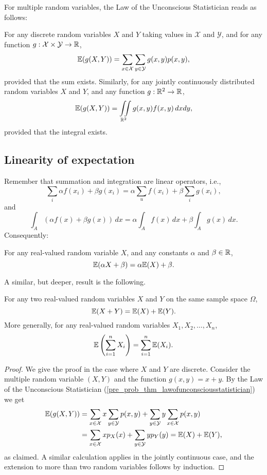 \documentclass[10pt, a4paper]{article}
\begin{document}
For multiple random variables,
the Law of the Unconscious Statistician reads as follows:
\begin{theorem}\label{pre_prob_thm_multilawofunconsciousstatistician}
    For any discrete random variables $X$ and $Y$ taking values in $\mathcal{X}$ and $\mathcal{Y}$,
    and for any function $g : \mathcal{X} \times \mathcal{Y} \rightarrow \mathbb{R}$,
    \[
    \mathbb{E}(g(X, Y)) = \sum_{x \in \mathcal{X}}\sum_{y \in \mathcal{Y}}g(x, y)p(x, y),
    \]
    provided that the sum exists.
    Similarly,
    for any jointly continuously distributed random variables $X$ and $Y$,
    and any function $g : \mathbb{R} ^ 2 \rightarrow \mathbb{R}$,
    \[
    \mathbb{E}(g(X, Y)) = \iint\limits_{\mathbb{R} ^ 2}g(x, y)f(x, y)\,dxdy,
    \]
    provided that the integral exists.
\end{theorem}

\subsection{Linearity of expectation}
Remember that summation and integration are linear operators,
i.e.,
\[
\sum_{i}\alpha f(x_i) + \beta g(x_i) = \alpha\sum_{u}f(x_i) + \beta\sum_{i}g(x_i),
\]
and
\[
\int_A(\alpha f(x) + \beta g(x))\,dx = \alpha\int_Af(x)\,dx + \beta\int_Ag(x)\,dx.
\]
Consequently:
\begin{theorem}
    For any real-valued random variable $X$,
    and any constants $\alpha$ and $\beta \in \mathbb{R}$,
    \[
    \mathbb{E}(\alpha X + \beta) = \alpha\mathbb{E}(X) + \beta.
    \]
\end{theorem}
A similar,
but deeper,
result is the following.
\begin{theorem}
    For any two real-valued random variables $X$ and $Y$ on the same sample space $\Omega$,
    \[
    \mathbb{E}(X + Y) = \mathbb{E}(X) + \mathbb{E}(Y).
    \]
    More generally,
    for any real-valued random variables $X_1, X_2, \dotsc, X_n$,
    \[
    \mathbb{E}\left(\sum_{i = 1}^{n}X_i\right) = \sum_{i = 1}^{n}\mathbb{E}(X_i).
    \]
    \begin{proof}
        We give the proof in the case where $X$ and $Y$ are discrete.
        Consider the multiple random variable $(X, Y)$ and the function $g(x, y) = x + y$.
        By the Law of the Unconscious Statistician
        (\autoref{pre_prob_thm_lawofunconsciousstatistician})
        we get
        \begin{align*}
            \mathbb{E}(g(X, Y)) &= \sum_{x \in \mathcal{X}}x\sum_{y \in \mathcal{Y}}p(x, y) + \sum_{y \in \mathcal{Y}}y\sum_{x \in \mathcal{X}}p(x, y) \\
            &= \sum_{x \in \mathcal{X}}xp_X(x) + \sum_{y \in \mathcal{Y}}yp_Y(y) = \mathbb{E}(X) + \mathbb{E}(Y),
        \end{align*}
        as claimed.
        A similar calculation applies in the jointly continuous case,
        and the extension to more than two random variables follows by induction.
    \end{proof}
\end{theorem}
\end{document}
